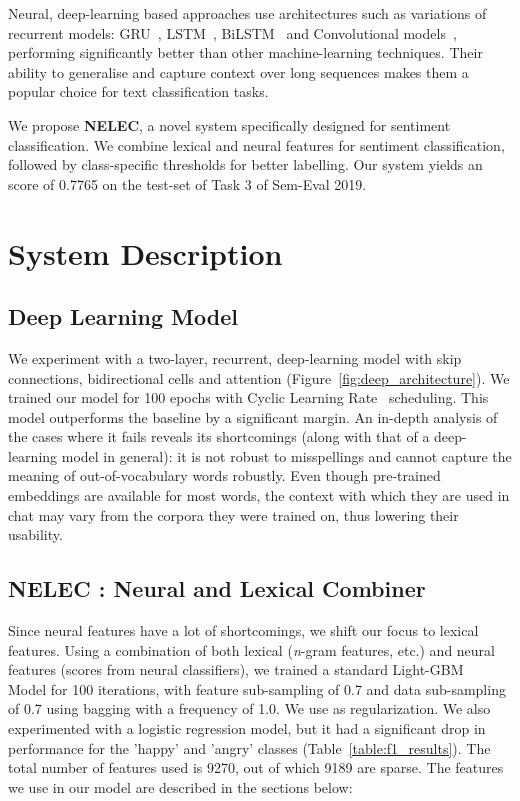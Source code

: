 \documentclass[11pt,a4paper]{article}
\begin{document}
Neural, deep-learning based approaches use architectures such as variations of recurrent models: GRU~\cite{chung2014empirical}, LSTM~\cite{hochreiter1997long}, BiLSTM~\cite{schuster1997bidirectional} and Convolutional models~\cite{mundra2017fine}, performing significantly better than other machine-learning techniques. Their ability to generalise and capture context over long sequences makes them a popular choice for text classification tasks. \par
We propose \textbf{NELEC}, a novel system specifically designed for sentiment classification. We combine lexical and neural features for sentiment classification, followed by class-specific thresholds for better labelling. Our system yields an  score of 0.7765 on the test-set of Task 3 of Sem-Eval 2019.

\section{System Description}

\subsection{Deep Learning Model} \label{deep_description}
We experiment with a two-layer, recurrent, deep-learning model with skip connections, bidirectional cells and attention (Figure~\ref{fig:deep_architecture}). We trained our model for 100 epochs with Cyclic Learning Rate~\cite{smith2017cyclical} scheduling. This model outperforms the baseline by a significant margin. An in-depth analysis of the cases where it fails reveals its shortcomings (along with that of a deep-learning model in general): it is not robust to misspellings and cannot capture the meaning of out-of-vocabulary words robustly. Even though pre-trained embeddings are available for most words, the context with which they are used in chat may vary from the corpora they were trained on, thus lowering their usability.
\subsection{NELEC : Neural and Lexical Combiner} \label{system_description}
Since neural features have a lot of shortcomings, we shift our focus to lexical features. Using a combination of both lexical (\textit{n}-gram features, etc.) and neural features (scores from neural classifiers), we trained a standard Light-GBM ~\cite{ke2017lightgbm} Model for 100 iterations, with feature sub-sampling of 0.7 and data sub-sampling of 0.7 using bagging with a frequency of 1.0. We use  as regularization. We also experimented with a logistic regression model, but it had a significant drop in performance for the 'happy' and 'angry' classes (Table~\ref{table:f1_results}). The total number of features used is 9270, out of which 9189 are sparse. The features we use in our model are described in the sections below:
\end{document}
